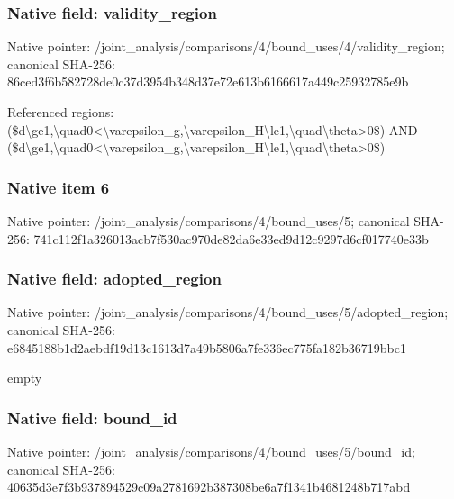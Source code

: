\documentclass[10pt,a4paper]{article}
\begin{document}
\subsubsection{Native field: validity\_\allowbreak{}region}
Native pointer: /joint\_\allowbreak{}analysis/comparisons/4/bound\_\allowbreak{}uses/4/validity\_\allowbreak{}region; canonical SHA-256: 86ced3f6b582728de0c37d3954b348d37e72e613b6166617a449c25932785e9b

\begingroup\raggedright\sloppy Referenced regions:\allowbreak{} (\$d\textbackslash{}ge1,\allowbreak{}\textbackslash{}quad0<\textbackslash{}varepsilon\_\allowbreak{}g,\allowbreak{}\textbackslash{}varepsilon\_\allowbreak{}H\textbackslash{}le1,\allowbreak{}\textbackslash{}quad\textbackslash{}theta>0\$) AND (\$d\textbackslash{}ge1,\allowbreak{}\textbackslash{}quad0<\textbackslash{}varepsilon\_\allowbreak{}g,\allowbreak{}\textbackslash{}varepsilon\_\allowbreak{}H\textbackslash{}le1,\allowbreak{}\textbackslash{}quad\textbackslash{}theta>0\$)\par\endgroup

\subsubsection{Native item 6}
Native pointer: /joint\_\allowbreak{}analysis/comparisons/4/bound\_\allowbreak{}uses/5; canonical SHA-256: 741c112f1a326013acb7f530ac970de82da6e33ed9d12c9297d6cf017740e33b

\subsubsection{Native field: adopted\_\allowbreak{}region}
Native pointer: /joint\_\allowbreak{}analysis/comparisons/4/bound\_\allowbreak{}uses/5/adopted\_\allowbreak{}region; canonical SHA-256: e6845188b1d2aebdf19d13c1613d7a49b5806a7fe336ec775fa182b36719bbc1

\begingroup\raggedright\sloppy empty\par\endgroup

\subsubsection{Native field: bound\_\allowbreak{}id}
Native pointer: /joint\_\allowbreak{}analysis/comparisons/4/bound\_\allowbreak{}uses/5/bound\_\allowbreak{}id; canonical SHA-256: 40635d3e7f3b937894529c09a2781692b387308be6a7f1341b4681248b717abd
\end{document}
